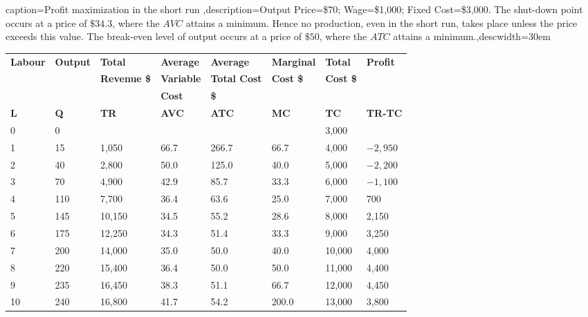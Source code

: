 \begin{Table}{caption={Profit maximization in the short run \label{table:profitmaxsr}},description={Output Price=\$70; Wage=\$1,000; Fixed Cost=\$3,000. The shut-down point occurs at a price of $\$34.3$, where the $AVC$ attains a minimum. Hence no production, even in the short run, takes place unless the price exceeds this value. The break-even level of output occurs at a price of $\$50$, where the $ATC$ attains a minimum.},descwidth={30em}}\footnotesize
\begin{tabu} to \linewidth {|X[1,c]X[1,c]X[1,c]X[1,c]X[1,c]X[1,c]X[1,c]X[1.2,c]|} \hline 
		\textbf{Labour} & \textbf{Output} & \textbf{Total} & \textbf{Average} & \textbf{Average} & \textbf{Marginal} & \textbf{Total} & \textbf{Profit} \\[-0.1em]
		&	&	\textbf{Revenue \$}	&	\textbf{Variable}	&	\textbf{Total Cost}	&	\textbf{Cost \$}	&	\textbf{Cost \$}	&	\\[-0.1em]
		&	&	&	\textbf{Cost}	&	\textbf{\$}	&	&	&	\\	\hline
	\textbf{L} & \textbf{Q} & \textbf{TR} & \textbf{AVC} & \textbf{ATC} & \textbf{MC} & \textbf{TC} & \textbf{TR-TC} \\
	0 & 0 &  &  &  &  & 3,000  &  \\
	1 & 15 & 1,050 & 66.7 & 266.7 & 66.7 & 4,000 & $-2,950$ \\
	2 & 40 & 2,800 & 50.0 & 125.0 & 40.0 & 5,000 & $-2,200$ \\
	3 & 70 & 4,900 & 42.9 & 85.7 & 33.3 & 6,000 & $-1,100$ \\
	4 & 110 & 7,700 & 36.4 & 63.6 & 25.0 & 7,000 & 700 \\
	5 & 145 & 10,150 & 34.5 & 55.2 & 28.6 & 8,000 & 2,150 \\
		6 & 175 & 12,250 & 34.3 & 51.4 & 33.3 & 9,000 & 3,250 \\
	7 & 200 & 14,000 & 35.0 &  50.0 &  40.0 & 10,000 & 4,000 \\ 
		8 & 220 & 15,400 & 36.4 &  50.0 &  50.0 & 11,000 & 4,400 \\
	9 & 235 & 16,450 & 38.3 &  51.1 &  66.7 & 12,000 & 4,450 \\
		10 & 240 & 16,800 & 41.7 &  54.2 & 200.0 & 13,000 &	3,800 \\	\hline
\end{tabu}
\end{Table}

